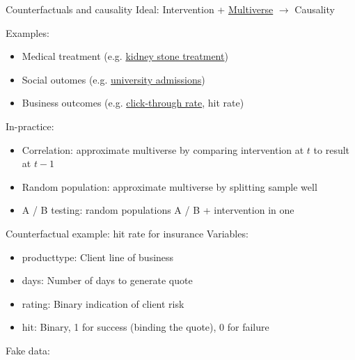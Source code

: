 \begin{frame}{Counterfactuals and causality}
    Ideal: Intervention + \href{https://en.wikipedia.org/wiki/Multiverse}{Multiverse} $\rightarrow$ Causality\newline

    Examples:
    \begin{itemize}
        \item Medical treatment (e.g. \href{https://en.wikipedia.org/wiki/Simpson\%27s_paradox\#Kidney_stone_treatment}{kidney stone treatment})
        \item Social outomes (e.g. \href{https://en.wikipedia.org/wiki/Simpson\%27s_paradox\#UC_Berkeley_gender_bias}{university admissions})
        \item Business outcomes (e.g. \href{https://en.wikipedia.org/wiki/Click-through\_rate}{click-through rate}, hit rate)\newline
    \end{itemize}

    In-practice:
    \begin{itemize}
        \item Correlation: approximate multiverse by comparing intervention at $t$ to result at $t-1$
        \item Random population: approximate multiverse by splitting sample well
        \item A / B testing: random populations A / B + intervention in one
    \end{itemize}
\end{frame}

\begin{frame}{Counterfactual example: hit rate for insurance}
    Variables:
    \begin{itemize}
        \item producttype: Client line of business
        \item days: Number of days to generate quote
        \item rating: Binary indication of client risk
        \item hit: Binary, 1 for success (binding the quote), 0 for failure\newline
    \end{itemize}

    Fake data:\newline\newline
    \newline
\end{frame}


